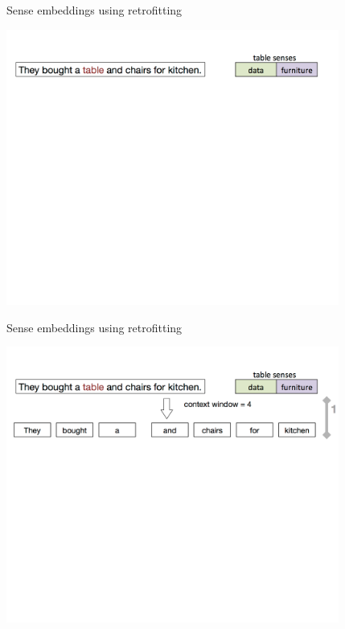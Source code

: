 \begin{frame}{Sense embeddings using retrofitting}
\vspace{-3em}
\begin{center}
\includegraphics[width=0.82\textwidth]{wsd-1}
\end{center}	
\end{frame}



\begin{frame}{Sense embeddings using retrofitting}
\vspace{-3em}
\begin{center}
\includegraphics[width=0.82\textwidth]{wsd-2}
\end{center}	
\end{frame}



